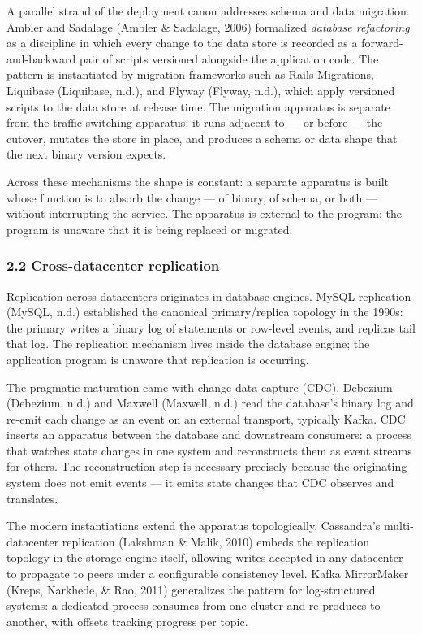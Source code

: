 \documentclass[
]{article}
\begin{document}
A parallel strand of the deployment canon addresses schema and data
migration. Ambler and Sadalage (Ambler \& Sadalage, 2006) formalized
\emph{database refactoring} as a discipline in which every change to the
data store is recorded as a forward-and-backward pair of scripts
versioned alongside the application code. The pattern is instantiated by
migration frameworks such as Rails Migrations, Liquibase (Liquibase,
n.d.), and Flyway (Flyway, n.d.), which apply versioned scripts to the
data store at release time. The migration apparatus is separate from the
traffic-switching apparatus: it runs adjacent to --- or before --- the
cutover, mutates the store in place, and produces a schema or data shape
that the next binary version expects.

Across these mechanisms the shape is constant: a separate apparatus is
built whose function is to absorb the change --- of binary, of schema,
or both --- without interrupting the service. The apparatus is external
to the program; the program is unaware that it is being replaced or
migrated.

\subsubsection{2.2 Cross-datacenter
replication}\label{cross-datacenter-replication}

Replication across datacenters originates in database engines. MySQL
replication (MySQL, n.d.) established the canonical primary/replica
topology in the 1990s: the primary writes a binary log of statements or
row-level events, and replicas tail that log. The replication mechanism
lives inside the database engine; the application program is unaware
that replication is occurring.

The pragmatic maturation came with change-data-capture (CDC). Debezium
(Debezium, n.d.) and Maxwell (Maxwell, n.d.) read the database's binary
log and re-emit each change as an event on an external transport,
typically Kafka. CDC inserts an apparatus between the database and
downstream consumers: a process that watches state changes in one system
and reconstructs them as event streams for others. The reconstruction
step is necessary precisely because the originating system does not emit
events --- it emits state changes that CDC observes and translates.

The modern instantiations extend the apparatus topologically.
Cassandra's multi-datacenter replication (Lakshman \& Malik, 2010)
embeds the replication topology in the storage engine itself, allowing
writes accepted in any datacenter to propagate to peers under a
configurable consistency level. Kafka MirrorMaker (Kreps, Narkhede, \&
Rao, 2011) generalizes the pattern for log-structured systems: a
dedicated process consumes from one cluster and re-produces to another,
with offsets tracking progress per topic.
\end{document}
